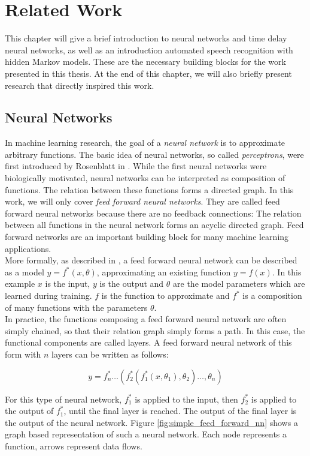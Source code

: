 
\chapter{Related Work}

This chapter will give a brief introduction to neural networks and time delay neural networks, as well as an introduction automated speech recognition with hidden Markov models. These are the necessary building blocks for the work presented in this thesis. At the end of this chapter, we will also briefly present research that directly inspired this work. 

\section{Neural Networks}

In machine learning research, the goal of a \textit{neural network} is to approximate arbitrary functions. The basic idea of neural networks, so called \textit{perceptrons}, were first introduced by Rosenblatt in \cite{rosenblatt1958perceptron}. While the first neural networks were biologically motivated, neural networks can be interpreted as composition of functions. The relation between these functions forms a directed graph. In this work, we will only cover \textit{feed forward neural networks}. They are called feed forward neural networks because there are no feedback connections: The relation between all functions in the neural network forms an acyclic directed graph. Feed forward networks are an important building block for many machine learning applications. 
\\
More formally, as described in \cite{Goodfellow-et-al-2016}, a feed forward neural network can be described as a model $y = f^*(x, \theta)$, approximating an existing function $y = f(x)$. In this example $x$ is the input, $y$ is the output and $\theta$ are the model parameters which are learned during training. $f$ is the function to approximate and $f^*$ is a composition of many functions with the parameters $\theta$. 
\\
In practice, the functions composing a feed forward neural network are often simply chained, so that their relation graph simply forms a path. In this case, the functional components are called layers. A feed forward neural network of this form with $n$ layers can be written as follows:

\[
y = f^*_n \dots (f^*_2(f^*_1(x, \theta_1), \theta_2) \dots, \theta_n)
\]

For this type of neural network, $f^*_1$ is applied to the input, then $f^*_2$ is applied to the output of $f^*_1$, until the final layer is reached. The output of the final layer is the output of the neural network. Figure \ref{fig:simple_feed_forward_nn} shows a graph based representation of such a neural network. Each node represents a function, arrows represent data flows. 

